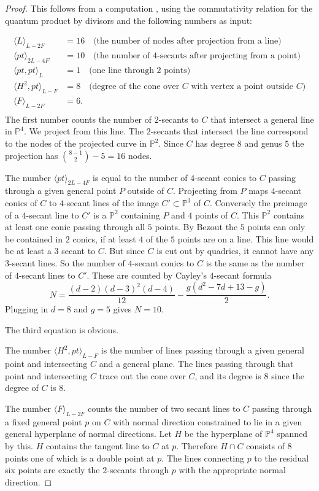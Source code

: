 \documentclass[11pt]{amsart}
\theoremstyle{plain}
\numberwithin{equation}{section}
\theoremstyle{definition}
\theoremstyle{remark}
\renewcommand{\P}{\mathbb P}
\begin{document}
\begin{proof}
This follows from a computation \cite{BvBS26}, using the commutativity relation for the quantum product by divisors and the following numbers as input: 

\begin{align*}
	\langle L \rangle_{L-2F} &= 16  \quad \text{(the number of nodes after projection from a line)} \\
	\langle pt \rangle_{2L-4F} &= 10  \quad \text{(the number of 4-secants after projecting from a point)} \\
	\langle pt,pt \rangle_L &= 1  \quad \text{(one line through 2 points)} \\
	\langle H^2,pt\rangle_{L-F} &= 8  \quad \text{(degree of the cone over $C$ with vertex a point outside $C$)} \\
	\langle F\rangle_{L-2F} &= 6 . \\
\end{align*}	
The first number counts the number of $2$-secants to $C$ that intersect a general line in $\P^4$. We project from this line. The $2$-secants that intersect the line correspond to the nodes of the projected curve in $\P^2$. Since $C$ has degree $8$ and genus $5$ the projection has ${8-1 \choose 2}-5 = 16$ nodes. 


The number $\langle pt \rangle_{2L-4F}$ is equal to the number of $4$-secant conics to $C$ passing through a given general point $P$ outside of $C$. Projecting from $P$ maps $4$-secant conics of $C$ to $4$-secant lines of the image $C'\subset \P^3$ of $C$. Conversely the preimage of a $4$-secant line to $C'$ is a $\P^2$ containing $P$ and $4$ points of $C$. This $\P^2$ contains at least one conic passing through all $5$ points. By Bezout the $5$ points can only be contained in $2$ conics, if at least $4$ of the $5$ points are on a line. This line would be at least a $3$ secant to $C$. But since $C$ is cut out by quadrics, it cannot have any $3$-secant lines. So the number of $4$-secant conics to $C$ is the same as the number of $4$-secant lines to $C'$. These are counted by Cayley's $4$-secant formula
\[
	N = \frac{(d-2)(d-3)^2(d-4)}{12} - \frac{g(d^2-7d+13-g)}{2}.
\]
Plugging in $d=8$ and $g=5$ gives $N=10$. 

The third equation is obvious.

The number $\langle H^2,pt\rangle_{L-F}$ is the number of lines passing through a given general point and intersecting $C$ and a general plane. The lines passing through that point and intersecting $C$ trace out the cone over $C$, and its degree is $8$ since the degree of $C$ is $8$. 

The number $\langle F\rangle_{L-2F}$ counts the number of two secant lines to $C$ passing through a fixed general point $p$ on $C$ with normal direction constrained to lie in a given general hyperplane of normal directions. Let $H$ be the hyperplane of $\P^4$ spanned by this. $H$ contains the tangent line to $C$ at $p$. Therefore $H\cap C$ consists of $8$ points one of which is a double point at $p$. The lines connecting $p$ to the residual six points are exactly the $2$-secants through $p$ with the appropriate normal direction.

\end{proof} 
\end{document}

